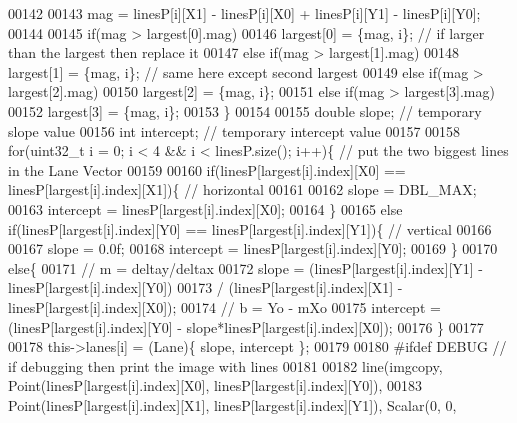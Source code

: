 \begin{DoxyCode}
00142 
00143         mag = linesP[i][X1] - linesP[i][X0] + linesP[i][Y1] - linesP[i][Y0];
00144 
00145         \textcolor{keywordflow}{if}(mag > largest[0].mag)
00146             largest[0] = \{mag, i\}; \textcolor{comment}{// if larger than the largest then replace it}
00147         \textcolor{keywordflow}{else} \textcolor{keywordflow}{if}(mag > largest[1].mag)
00148             largest[1] = \{mag, i\}; \textcolor{comment}{// same here except second largest}
00149         \textcolor{keywordflow}{else} \textcolor{keywordflow}{if}(mag > largest[2].mag)
00150             largest[2] = \{mag, i\};
00151         \textcolor{keywordflow}{else} \textcolor{keywordflow}{if}(mag > largest[3].mag)
00152             largest[3] = \{mag, i\};
00153     \}
00154 
00155     \textcolor{keywordtype}{double} slope; \textcolor{comment}{// temporary slope value}
00156     \textcolor{keywordtype}{int} intercept; \textcolor{comment}{// temporary intercept value}
00157 
00158     \textcolor{keywordflow}{for}(uint32\_t i = 0; i < 4 && i < linesP.size(); i++)\{  \textcolor{comment}{// put the two biggest lines in the Lane
       Vector }
00159 
00160         \textcolor{keywordflow}{if}(linesP[largest[i].index][X0] == linesP[largest[i].index][X1])\{ \textcolor{comment}{// horizontal }
00161 
00162             slope = DBL\_MAX;
00163             intercept = linesP[largest[i].index][X0];
00164         \}
00165         \textcolor{keywordflow}{else} \textcolor{keywordflow}{if}(linesP[largest[i].index][Y0] == linesP[largest[i].index][Y1])\{ \textcolor{comment}{// vertical}
00166 
00167             slope = 0.0f;
00168             intercept = linesP[largest[i].index][Y0];
00169         \}
00170         \textcolor{keywordflow}{else}\{
00171         \textcolor{comment}{// m = deltay/deltax}
00172         slope = (linesP[largest[i].index][Y1] - linesP[largest[i].index][Y0])
00173                     / (linesP[largest[i].index][X1] - linesP[largest[i].index][X0]);
00174         \textcolor{comment}{// b = Yo - mXo}
00175         intercept = (linesP[largest[i].index][Y0] - slope*linesP[largest[i].index][X0]);
00176         \}
00177 
00178         \textcolor{keyword}{this}->lanes[i] = (Lane)\{ slope, intercept \};
00179 
00180         \textcolor{preprocessor}{#}\textcolor{preprocessor}{ifdef} \textcolor{preprocessor}{DEBUG} \textcolor{comment}{// if debugging then print the image with lines}
00181 
00182         line(imgcopy, Point(linesP[largest[i].index][X0], linesP[largest[i].index][Y0]),
00183                     Point(linesP[largest[i].index][X1], linesP[largest[i].index][Y1]), Scalar(0, 0, 

\end{DoxyCode}
